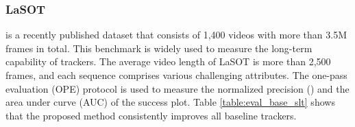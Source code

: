 \begin{table*}[t]
\centering
\caption{
Performance of sequence-level training on LaSOT, TrackingNet, and GOT-10k.
}
\label{table:eval_base_slt}
\end{table*}


\subsubsection{LaSOT \cite{lasot}} is a recently published dataset that consists of 1,400 videos with more than 3.5M frames in total.
This benchmark is widely used to measure the long-term capability of trackers. 
The average video length of LaSOT is more than 2,500 frames, and each sequence comprises various challenging attributes.
The one-pass evaluation (OPE) protocol is used to measure the normalized precision () and the area under curve (AUC) of the success plot.
Table \ref{table:eval_base_slt} shows that the proposed method consistently improves all baseline trackers.


